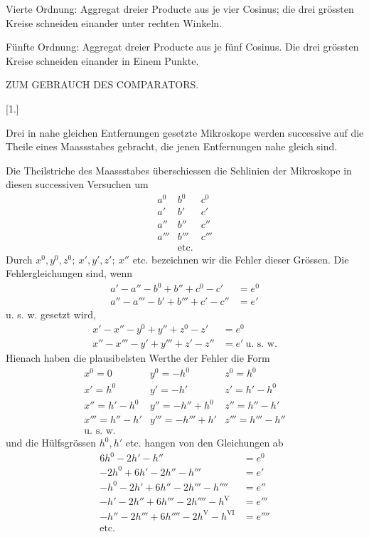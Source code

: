 Vierte Ordnung: Aggregat dreier Producte aus je vier Cosinus; die drei grössten Kreise schneiden einander unter rechten Winkeln.

Fünfte Ordnung: Aggregat dreier Producte aus je fünf Cosinus. Die drei grössten Kreise schneiden einander in Einem Punkte.

\begin{center}ZUM GEBRAUCH DES COMPARATORS.\end{center}
\begin{center}[1.]\end{center}
Drei in nahe gleichen Entfernungen gesetzte Mikroskope werden successive auf die Theile eines Maassstabes gebracht, die jenen Entfernungen nahe gleich sind.

Die Theilstriche des Maassstabes überschiessen die Sehlinien der Mikro\-skope in diesen successiven Versuchen um
\[
\begin{array}{ccc}
a^0&b^0&c^0\\
a'&b'&c'\\
a''&b''&c''\\
a'''&b'''&c'''\\
&\text{etc.}&
\end{array}
\]
Durch $x^0,y^0,z^0;\ x',y',z';\ x''$ etc. bezeichnen wir die Fehler dieser Grössen. Die Fehlergleichungen sind, wenn
\[
\begin{aligned}
a'-a''-b^0+b''+c^0-c'&=e^0\\
a''-a'''-b'+b'''+c'-c''&=e'
\end{aligned}
\]
u. s. w. gesetzt wird,
\[
\begin{aligned}
x'-x''-y^0+y''+z^0-z'&=e^0\\
x''-x'''-y'+y'''+z'-z''&=e'\ \text{u. s. w.}
\end{aligned}
\]
Hienach haben die plausibelsten Werthe der Fehler die Form
\[
\begin{array}{lll}
x^0=0&y^0=-h^0&z^0=h^0\\
x'=h^0&y'=-h'&z'=h'-h^0\\
x''=h'-h^0&y''=-h''+h^0&z''=h''-h'\\
x'''=h''-h'&y'''=-h'''+h'&z'''=h'''-h''\\
\text{u. s. w.}&&
\end{array}
\]
und die Hülfsgrössen $h^0,h'$ etc. hangen von den Gleichungen ab
\[
\begin{aligned}
6h^0-2h'-h''&=e^0\\
-2h^0+6h'-2h''-h'''&=e'\\
-h^0-2h'+6h''-2h'''-h''''&=e''\\
-h'-2h''+6h'''-2h''''-h^{\mathrm V}&=e'''\\
-h''-2h'''+6h''''-2h^{\mathrm V}-h^{\mathrm {VI}}&=e''''\\
\text{etc.}&
\end{aligned}
\]

